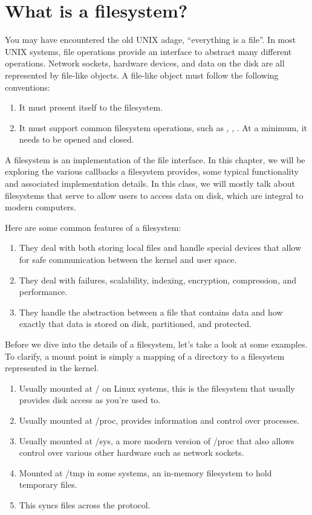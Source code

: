 \section{What is a filesystem?}

You may have encountered the old UNIX adage, ``everything is a file''.
In most UNIX systems, file operations provide an interface to abstract many different operations.
Network sockets, hardware devices, and data on the disk are all represented by file-like objects.
A file-like object must follow the following conventions:

\begin{enumerate}
  \item It must present itself to the filesystem.
  \item It must support common filesystem operations, such as , , .
        At a minimum, it needs to be opened and closed.
\end{enumerate}

A filesystem is an implementation of the file interface.
In this chapter, we will be exploring the various callbacks a filesystem provides, some typical functionality and associated implementation details.
In this class, we will mostly talk about filesystems that serve to allow users to access data on disk, which are integral to modern computers.

Here are some common features of a filesystem:

\begin{enumerate}
    \item They deal with both storing local files and handle special devices that allow for safe communication between the kernel and user space.
    \item They deal with failures, scalability, indexing, encryption, compression, and performance.
    \item They handle the abstraction between a file that contains data and how exactly that data is stored on disk, partitioned, and protected.
\end{enumerate}

Before we dive into the details of a filesystem, let's take a look at some examples.
To clarify, a mount point is simply a mapping of a directory to a filesystem represented in the kernel.

\begin{enumerate}
  \item {} Usually mounted at / on Linux systems, this is the filesystem that usually provides disk access as you're used to.
  \item {} Usually mounted at /proc, provides information and control over processes.
  \item {} Usually mounted at /sys, a more modern version of /proc that also allows control over various other hardware such as network sockets.
  \item {} Mounted at /tmp in some systems, an in-memory filesystem to hold temporary files.
  \item {} This syncs files across the  protocol.
\end{enumerate}


